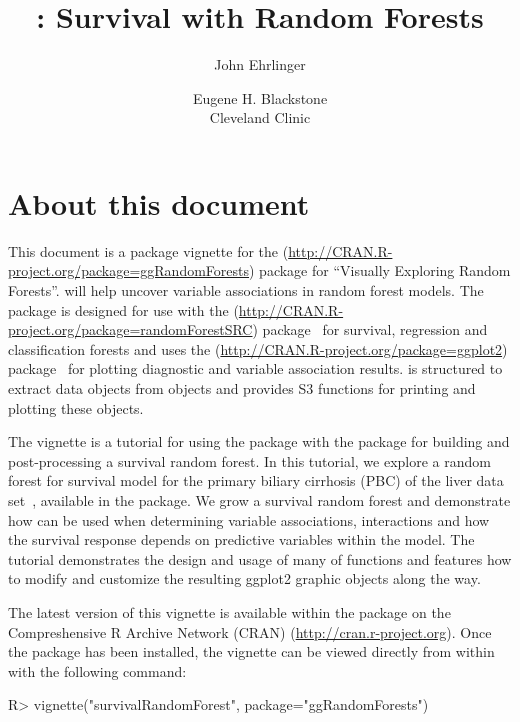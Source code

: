 \documentclass[nojss]{jss}\usepackage[]{graphicx}\usepackage[]{color}
\author{John Ehrlinger 
\and Eugene H. Blackstone\\Cleveland Clinic}
\title{\pkg{ggRandomForests}: Survival with Random Forests}
\begin{document}
\section{About this document}

This document is a package vignette for the  (\url{http://CRAN.R-project.org/package=ggRandomForests}) package for ``Visually Exploring Random Forests''.  will help uncover variable associations in random forest models. The package is designed for use with the  (\url{http://CRAN.R-project.org/package=randomForestSRC}) package~\citep{Ishwaran:RFSRC:2014} for survival, regression and classification forests and uses the (\url{http://CRAN.R-project.org/package=ggplot2}) package~\citep{Wickham:2009} for plotting diagnostic and variable association results.  is  structured to extract data objects from  objects and provides S3 functions for printing and plotting these objects.

The vignette is a tutorial for using the  package with the  package for building and post-processing a survival random forest. In this tutorial, we explore a random forest for survival model for the primary biliary cirrhosis (PBC) of the liver data set~\citep{fleming:1991}, available in the  package. We grow a survival random forest and demonstrate how  can be used when determining variable associations, interactions and how the survival response depends on predictive variables within the model. The tutorial demonstrates the design and usage of many of  functions and features how to modify and customize the resulting ggplot2 graphic objects along the way.

The latest version of this vignette is available within the  package on the Compreshensive R Archive Network (CRAN) (\url{http://cran.r-project.org}). Once the package has been installed, the vignette can be viewed directly from within  with the following command:
\begin{Schunk}
\begin{Sinput}
R> vignette("survivalRandomForest", package="ggRandomForests")
\end{Sinput}
\end{Schunk}
\end{document}
